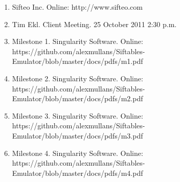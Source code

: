 \documentclass[12pt]{article}
\begin{document}
        \begin{enumerate}
                \item{Sifteo Inc. Online: http://www.sifteo.com}
                \item{Tim Ekl.  Client Meeting. 25 October 2011 2:30 p.m.}
                \item{Milestone 1.  Singularity Software.  Online: https://github.com/alexmullans/Siftables-Emulator/blob/master/docs/pdfs/m1.pdf}
                \item{Milestone 2.  Singularity Software.  Online: https://github.com/alexmullans/Siftables-Emulator/blob/master/docs/pdfs/m2.pdf}
                \item{Milestone 3.  Singularity Software.  Online: https://github.com/alexmullans/Siftables-Emulator/blob/master/docs/pdfs/m3.pdf}
                \item{Milestone 4.  Singularity Software.  Online: https://github.com/alexmullans/Siftables-Emulator/blob/master/docs/pdfs/m4.pdf}

        \end{enumerate}
        
\clearpage

\printindex
        
\end{document}
